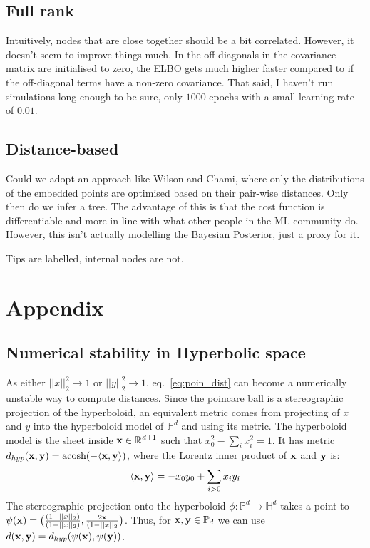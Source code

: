 \documentclass[11pt]{article}
\begin{document}
\subsection{Full rank}
Intuitively, nodes that are close together should be a bit correlated. However, it doesn't seem to improve things much. In the off-diagonals in the covariance matrix are initialised to zero, the ELBO gets much higher faster compared to if the off-diagonal terms have a non-zero covariance. That said, I haven't run simulations long enough to be sure, only $1000$ epochs with a small learning rate of $0.01$.

\subsection{Distance-based}
Could we adopt an approach like Wilson and Chami, where only the distributions of the embedded points are optimised based on their pair-wise distances.
Only then do we infer a tree.
The advantage of this is that the cost function is differentiable and more in line with what other people in the ML community do.
However, this isn't actually modelling the Bayesian Posterior, just a proxy for it.

Tips are labelled, internal nodes are not.

\section{Appendix}
\subsection{Numerical stability in Hyperbolic space}
As either $||x||_{2}^{2}\to 1$ or $||y||_{2}^{2} \to 1$, eq.~\ref{eq:poin_dist} can become a numerically unstable way to compute distances.
Since the poincare ball is a stereographic projection of the hyperboloid, an equivalent metric comes from projecting of $x$ and $y$ into the hyperboloid model of $\mathbb{H}^{d}$ and using its metric.
The hyperboloid model is the sheet inside $\bold{x}\in\mathbb{R}^{d+1}$ such that $x_{0}^{2} - \sum_{i} x_{i}^{2} = 1$.
It has metric $d_{hyp}(\bold{x}, \bold{y}) = \text{acosh}(-\langle \bold{x}, \bold{y} \rangle)$, where the Lorentz inner product of $\bold{x}$ and $\bold{y}$ is:
\begin{equation*}
	\langle \bold{x}, \bold{y} \rangle = -x_{0}y_{0} + \sum_{i>0} x_{i}y_{i}
\end{equation*}
The stereographic projection onto the hyperboloid $\phi:\mathbb{P}^{d} \to \mathbb{H}^{d}$ takes a point to $\psi(\bold{x}) = \big(\frac{(1+||x||_{2})}{(1-||x||_{2})}, \frac{2 \bold{x}}{(1- ||x||_{2}}\big)$.
Thus, for $\bold{x}, \bold{y} \in \mathbb{P}_{d}$ we can use $d(\bold{x}, \bold{y}) = d_{hyp}(\psi(\bold{x}), \psi(\bold{y}))$.

\end{document}
